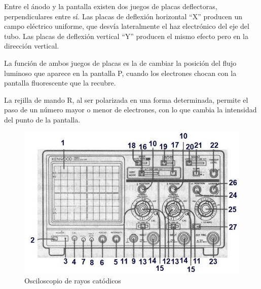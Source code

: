 \documentclass{report}
\begin{document}
Entre el ánodo y la pantalla existen dos juegos de placas deflectoras,
perpendiculares entre sí. Las placas de deflexión horizontal “X” producen un campo
eléctrico uniforme, que desvía lateralmente el haz electrónico del eje del tubo. Las
placas de deflexión vertical “Y” producen el mismo efecto pero en la dirección
vertical.\par
La función de ambos juegos de placas es la de cambiar la posición del flujo luminoso
que aparece en la pantalla P, cuando los electrones chocan con la pantalla
fluorescente que la recubre.\par
La rejilla de mando R, al ser polarizada en una forma determinada, permite el paso
de un número mayor o menor de electrones, con lo que cambia la intensidad del
punto de la pantalla.
\begin{figure}[H]
\begin{center}
\includegraphics[width=\linewidth]{F2}
\end{center}
\caption{Osciloscopio de rayos catódicos}
\label{F2}
\end{figure}
\end{document}
